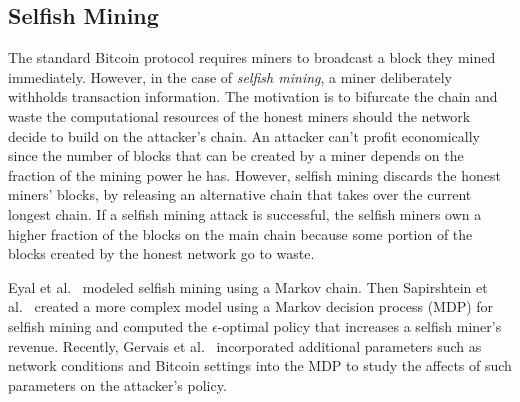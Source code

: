 
\subsection{Selfish Mining}

The standard Bitcoin protocol requires miners to broadcast a block they mined immediately. However, in the case of {\em selfish mining}, a miner deliberately withholds transaction information. The motivation is to bifurcate the chain and waste the computational resources of the honest miners should the network decide to build on the attacker's chain. An attacker can't profit economically since the number of blocks that can be created by a miner depends on the fraction of the mining power he has. However, selfish mining discards the honest miners' blocks, by releasing an alternative chain that takes over the current longest chain. If a selfish mining attack is successful, the selfish miners own a higher fraction of the blocks on the main chain because some portion of the blocks created by the honest network go to waste.

Eyal et al.~\cite{eyal:2014} modeled selfish mining using a Markov chain. Then Sapirshtein et al.~\cite{sapirshtein:2015} created a more complex model using a Markov decision process (MDP) for selfish mining and computed the $\epsilon$-optimal policy that increases a selfish miner's revenue. Recently, Gervais et al.~\cite{Gervais:2016} incorporated additional parameters such as network conditions and Bitcoin settings into the MDP to study the affects of such parameters on the attacker's policy. %

